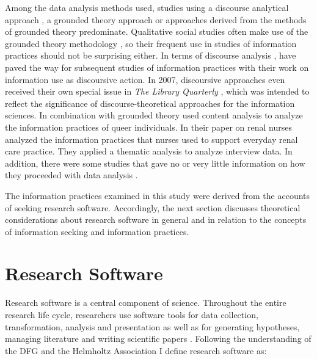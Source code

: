 \documentclass[12pt, a4paper, titlepage, oneside, abstract=true, toc=listof, toc=bibliography, BCOR=1cm]{scrreprt}
\begin{document}
Among the data analysis methods used, studies using a discourse analytical approach \citep{Johannisson2007, Mohammad2020, McKenzie2002, McKenzie2003, McKenzie2003a, Olsson2007, Olsson2010}, a grounded theory approach \citep{Floegel2019, Fry2006, Greyson2017, Greyson2018, Harlan2012, Harlan2012a, Harlan2014, Lloyd2007, Lloyd2013} 
or approaches derived from the methods of grounded theory \citep{Kitzie2020, Olsson2010, Olsson2016, Veinot2007} predominate. Qualitative social studies often make use of the grounded theory methodology \citep{Corbin1990}, so their frequent use in studies of information practices should not be surprising either. In terms of discourse analysis \citep{Foucault1971}, \citet{Tuominen1997} have paved the way for subsequent studies of information practices with their work on information use as discoursive action. In 2007, discoursive approaches even received their own special issue in \textit{The Library Quarterly} \citep{Talja2007}, which was intended to reflect the significance of discourse-theoretical approaches for the information sciences. 
In combination with grounded theory \citet{Floegel2019} used content analysis to analyze the information practices of queer individuals. 
In their paper on renal nurses \citet{Bonner2011} analyzed the information practices that nurses used to support everyday renal care practice. They applied a thematic analysis \citep{Liamputtong2013} to analyze interview data. 
In addition, there were some studies that gave no or very little information on how they proceeded with data analysis \citep[e.g.][]{Boyum2015, Caidi2008a, Talja2003, Roos2015}. 

The information practices examined in this study were derived from the accounts of seeking research software. Accordingly, the next section discusses theoretical considerations about research software in general and in relation to the concepts of information seeking and information practices. 

\section{Research Software}
\label{sec:R_SW}
Research software is a central component of science. Throughout the entire research life cycle, researchers use software tools for data collection, transformation, analysis and presentation as well as for generating hypotheses, managing literature and writing scientific papers \citep{Kethers2017, Pan2016, Wolski2017}.
Following the understanding of the \gls{DFG} \citep{Katerbow2018} and the Helmholtz Association \citep{Scheliga2019} I define research software as: 
\end{document}
